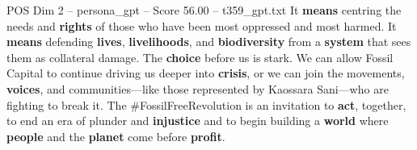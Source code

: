 \begin{textsample}{POS Dim 2 – persona\_gpt – Score 56.00 – t359\_gpt.txt}
It \textbf{means} centring the needs and \textbf{rights} of those who have been most oppressed and most harmed.
It \textbf{means} defending \textbf{lives}, \textbf{livelihoods}, and \textbf{biodiversity} from a \textbf{system} that sees them as collateral damage.
The \textbf{choice} before us is stark.
We can allow Fossil Capital to continue driving us deeper into \textbf{crisis}, or we can join the movements, \textbf{voices}, and communities—like those represented by Kaossara Sani—who are fighting to break it.
The \#FossilFreeRevolution is an invitation to \textbf{act}, together, to end an era of plunder and \textbf{injustice} and to begin building a \textbf{world} where \textbf{people} and the \textbf{planet} come before \textbf{profit}.

\end{textsample}
